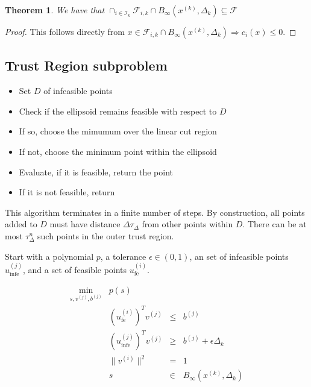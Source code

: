 \documentclass{article}
\newtheorem{theorem}{Theorem}[section]
\theoremstyle{case}
\newcommand{\dk}{\Delta_k}
\newcommand{\xk}{{x^{(k)}}}
\newcommand{\fik}{{\mathcal F_{i, k}}}
\newcommand{\iik}{{\mathcal I_{k}}}
\newcommand{\f}{{\mathcal F}}
\begin{document}
\begin{theorem}
We have that $\cap_{i \in \iik} \fik \cap B_{\infty}(\xk, \dk) \subseteq \f$ 
\end{theorem}

\begin{proof}
This follows directly from $x \in \fik \cap B_{\infty}(\xk, \dk) \Longrightarrow c_i(x) \le 0$.
\end{proof}



\subsection{Trust Region subproblem}


\color{red}
\begin{itemize}
\item Set $D$ of infeasible points
\item Check if the ellipsoid remains feasible with respect to $D$
\item If so, choose the mimumum over the linear cut region
\item If not, choose the minimum point within the ellipsoid
\item Evaluate, if it is feasible, return the point
\item If it is not feasible, return 
\end{itemize}

This algorithm terminates in a finite number of steps.
By construction, all points added to $D$ must have distance $\Delta  \tau_{\Delta}$ from other points within $D$.
There can be at most $\tau_{\Delta}^n$ such points in the outer trust region.


Start with a polynomial $p$, a tolerance $\epsilon \in (0, 1)$, an set of infeasible points $u_{\text{infe}}^{(j)}$, and a set of feasible points $u_{\text{fe}}^{(i)}$.

\begin{displaymath}
\begin{array}{ccccc}
\min_{s, v^{(j)}, b^{(j)}}	& p(s)                          &       &                            \\
							& \left(u_{\text{fe}}^{(i)}\right)^T v^{(j)}     & \le   & b^{(j)}                     \\
							& \left(u_{\text{infe}}^{(j)}\right)^T v^{(j)}      & \ge   & b^{(j)} + \epsilon \Delta_k       \\
							& \|v^{(i)}\|^2   & =     & 1                           \\
							& s          & \in   & B_{\infty}(x^{(k)}, \Delta_k)    \\
\end{array}
\end{displaymath}
\end{document}
